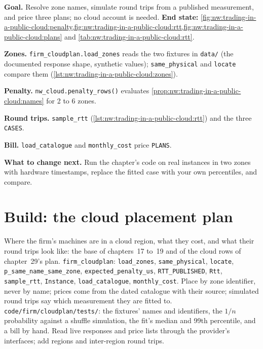\begin{tutorial}
\textbf{Goal.} Resolve zone names, simulate round trips from a published measurement, and price three plans; no cloud account is needed.
\textbf{End state:} \cref{fig:nw:trading-in-a-public-cloud:penalty,fig:nw:trading-in-a-public-cloud:rtt,fig:nw:trading-in-a-public-cloud:plans}
and \cref{tab:nw:trading-in-a-public-cloud:rtt}.
\begin{tutsteps}
\item \textbf{Zones.} \texttt{firm\_cloudplan.load\_zones} reads the two fixtures in \texttt{data/} (the documented response shape, synthetic
  values); \texttt{same\_physical} and \texttt{locate} compare them (\cref{lst:nw:trading-in-a-public-cloud:zones}).
\item \textbf{Penalty.} \texttt{nw\_cloud.penalty\_rows()} evaluates \cref{prop:nw:trading-in-a-public-cloud:names} for 2 to 6 zones.
\item \textbf{Round trips.} \texttt{sample\_rtt} (\cref{lst:nw:trading-in-a-public-cloud:rtt}) and the three \texttt{CASES}.
\item \textbf{Bill.} \texttt{load\_catalogue} and \texttt{monthly\_cost} price \texttt{PLANS}.
\end{tutsteps}
\textbf{What to change next.} Run the chapter's code on real instances in two zones with hardware timestamps, replace the fitted case with your own
percentiles, and compare.
\end{tutorial}

\section{Build: the cloud placement plan}\label{bld:nw:trading-in-a-public-cloud:cloudplan}

\begin{build}
 Where the firm's machines are in a cloud region, what they cost, and what their round trips look like: the base of chapters~17 to~19
and of the cloud rows of chapter~29's plan.
 \texttt{firm\_cloudplan}: \texttt{load\_zones}, \texttt{same\_physical}, \texttt{locate}, \texttt{p\_same\_name\_same\_zone},
\texttt{expected\_penalty\_us}, \texttt{RTT\_PUBLISHED}, \texttt{Rtt}, \texttt{sample\_rtt}, \texttt{Instance}, \texttt{load\_catalogue},
\texttt{monthly\_cost}.
 Place by zone identifier, never by name; prices come from the dated catalogue with their source; simulated round trips say which
measurement they are fitted to.
 \texttt{code/firm/cloudplan/tests/}: the fixtures' names and identifiers, the $1/n$ probability against a shuffle
simulation, the fit's median and 99th percentile, and a bill by hand.
 Read live responses and price lists through the provider's interfaces; add regions and inter-region round trips.
\end{build}

